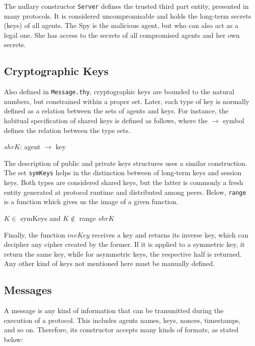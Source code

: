 The nullary constructor \texttt{Server} defines the trusted third part entity, presented in many protocols. It is considered uncompromisable and holds the long-term secrets (keys) of all agents. The Spy is the malicious agent, but who can also act as a legal one. She has access to the secrets of all compromised agents and her own secrets.



\subsection{Cryptographic Keys}
Also defined in \texttt{Message.thy}, cryptographic keys are bounded to the natural numbers, but constrained within a proper set. Later, each type of key is normally defined as a relation between the sets of agents and keys. For instance, the habitual specification of shared keys is defined as follows, where the \( \longrightarrow \) symbol defines the relation between the type sets.

\begin{center}
  {\ttfamily \(shrK\): agent \( \longrightarrow \) key}
\end{center}

The description of public and private keys structures uses a similar construction. The set \texttt{symKeys} helps in the distinction between of long-term keys and session keys. Both types are considered shared keys, but the latter is commonly a fresh entity generated at protocol runtime and distributed among peers. Below, \texttt{range} is a function which gives us the image of a given function.

\begin{center}
  {\ttfamily \(K \in \) symKeys} and {\ttfamily \(K \notin \) range \(shrK\)}
\end{center}

Finally, the function \(invKey\) receives a key and returns its inverse key, which can decipher any cipher created by the former. If it is applied to a symmetric key, it return the same key, while for asymmetric keys, the respective half is returned. Any other kind of keys not mentioned here must be manually defined.



\subsection{Messages}
A message is any kind of information that can be transmitted during the execution of a protocol. This includes agents names, keys, nonces, timestamps, and so on. Therefore, its constructor accepts many kinds of formats, as stated below:

